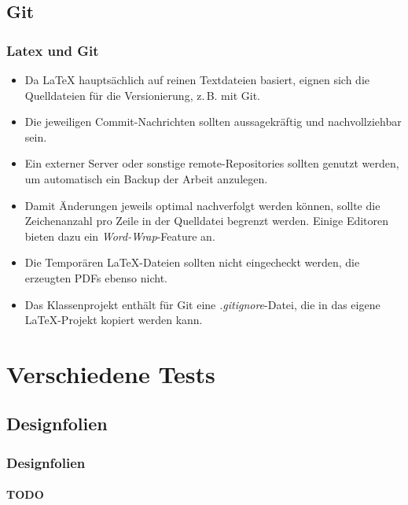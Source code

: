 \documentclass[german,notoc]{tudbeamer}%
\begin{document}
\subsection{Git}

\begin{frame}
	\frametitle{Latex und Git}
	\begin{itemize}
		\item Da LaTeX hauptsächlich auf reinen Textdateien basiert, eignen sich die Quelldateien für die Versionierung, z.\,B. mit Git.
		\item Die jeweiligen Commit-Nachrichten sollten aussagekräftig und nachvollziehbar sein.
		\item Ein externer Server oder sonstige remote-Repositories sollten genutzt werden, um automatisch ein Backup der Arbeit anzulegen.
		\item Damit Änderungen jeweils optimal nachverfolgt werden können, sollte die Zeichenanzahl pro Zeile in der Quelldatei begrenzt werden. Einige Editoren bieten dazu ein \emph{Word-Wrap}-Feature an.
		\item Die Temporären LaTeX-Dateien sollten nicht eingecheckt werden, die erzeugten PDFs ebenso nicht.
		\item Das Klassenprojekt enthält für Git eine \emph{.gitignore}-Datei, die in das eigene LaTeX-Projekt kopiert werden kann.
	\end{itemize}
\end{frame}

\section{Verschiedene Tests}	
\subsection{Designfolien}

\begin{frame}
	\frametitle{Designfolien}
	\framesubtitle{TODO}
\end{frame}

\end{document}
